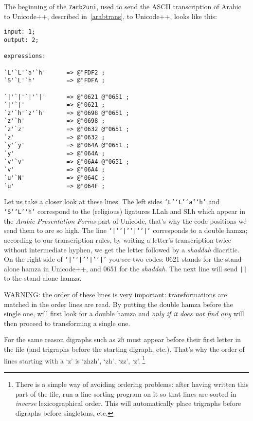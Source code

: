 \documentclass[a4paper,11pt]{article}
\def\shortarab#1{{\pushocplist\ArabicOCP\fontfamily{omarb}\selectfont#1\popocplist}}
\begin{document}
The beginning of the \OTP{} \texttt{7arb2uni}, used to send the ASCII
transcription of Arabic to Unicode++, described in~\ref{arabtrans}, to
Unicode++, looks like this:

\begin{verbatim}
input: 1;
output: 2;

expressions:

`L'`L'`a'`h'      => @"FDF2 ;
`S'`L'`h'         => @"FDFA ;

`|'`|'`|'`|'      => @"0621 @"0651 ;
`|'`|'            => @"0621 ;
`z'`h'`z'`h'      => @"0698 @"0651 ;
`z'`h'            => @"0698 ;
`z'`z'            => @"0632 @"0651 ;
`z'               => @"0632 ;
`y'`y'            => @"064A @"0651 ;
`y'               => @"064A ;
`v'`v'            => @"06A4 @"0651 ;
`v'               => @"06A4 ;
`u'`N'            => @"064C ;
`u'               => @"064F ;
\end{verbatim}

Let us take a closer look at these lines. The left sides
\texttt{`L'`L'`a'`h'} and \texttt{`S'`L'`h'} correspond to the
(religious) ligatures \shortarab{LLah} and \shortarab{SLh} which
appear in the \emph{Arabic Presentation Forms} part of Unicode, that's
why the code positions we send them to are so high. The line
\texttt{`|'`|'`|'`|'} corresponds to a double hamza; according to our
transcription rules, by writing a letter's transcription twice without
intermediate hyphen, we get the letter followed by a \emph{shaddah}
diacritic. On the right side of \texttt{`|'`|'`|'`|'} you see two
codes: 0621 stands for the stand-alone hamza in Unicode++, and 0651
for the \emph{shaddah}. The next line will send \texttt{||} to the
stand-alone hamza.

WARNING: the order of these lines is very important: transformations
are matched in the order lines are read. By putting the double hamza
before the single one, \OMEGA{} will first look for a double hamza and
\emph{only if it does not find any} will then proceed to transforming
a single one.

For the same reason digraphs such as \texttt{zh} must appear before
their first letter in the \OTP{} file (and trigraphs before the
starting digraph, etc.). That's why the order of lines starting with a
`z' is `zhzh', `zh', `zz', `z'.%
\footnote{There is a simple way of avoiding ordering problems: after
having written this part of the \OTP{} file, run a line sorting
program on it so that lines are sorted in \emph{inverse}
lexicographical order. This will automatically place trigraphs before
digraphs before singletons, etc.}
\end{document}
